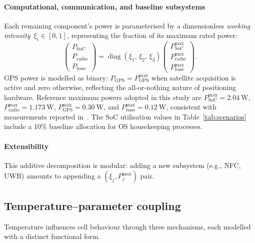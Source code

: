 \documentclass[5p,times,number]{elsarticle}
\newcommand{\tabref}[1]{\hyperref[#1]{\textup{Table~\ref*{#1}}}}
\def\tabref#1{Table~\ref{#1}}
\begin{document}
\paragraph{Computational, communication, and baseline subsystems}
Each remaining component's power is parameterised by a dimensionless \emph{working intensity}~$\xi_i \in [0,1]$, representing the fraction of its maximum rated power:
\begin{equation}\label{eq:xi}
\begin{pmatrix} P_{\mathrm{SoC}} \\ P_{\mathrm{radio}} \\ P_{\mathrm{base}} \end{pmatrix}
= \operatorname{diag}(\xi_1,\,\xi_2,\,\xi_3)
\begin{pmatrix} P_{\mathrm{SoC}}^{\max} \\ P_{\mathrm{radio}}^{\max} \\ P_{\mathrm{base}}^{\max} \end{pmatrix}.
\end{equation}
GPS power is modelled as binary: $P_{\mathrm{GPS}} = P_{\mathrm{GPS}}^{\max}$ when satellite acquisition is active and zero otherwise, reflecting the all-or-nothing nature of positioning hardware.
Reference maximum powers adopted in this study are $P_{\mathrm{SoC}}^{\max} = \SI{2.04}{\watt}$, $P_{\mathrm{radio}}^{\max} = \SI{1.173}{\watt}$, $P_{\mathrm{GPS}}^{\max} = \SI{0.30}{\watt}$, and $P_{\mathrm{base}}^{\max} = \SI{0.12}{\watt}$, consistent with measurements reported in~\cite{Carroll2010,Chen2014}.
The SoC utilisation values in \tabref{tab:scenarios} include a 10\% baseline allocation for OS housekeeping processes.

\paragraph{Extensibility}
This additive decomposition is modular: adding a new subsystem (e.g., NFC, UWB) amounts to appending a $(\xi_j, P_j^{\max})$ pair.

\subsection{Temperature--parameter coupling}\label{sec:temperature}
Temperature influences cell behaviour through three mechanisms, each modelled with a distinct functional form.
\end{document}
